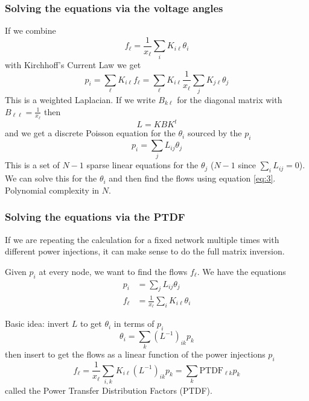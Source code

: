 \documentclass[10pt,aspectratio=169,dvipsnames]{beamer}
\begin{document}
\begin{frame}
  \frametitle{Solving the equations via the voltage angles}

  If we combine
    \begin{equation}
    f_\ell  = \frac{1}{x_\ell}\sum_{i} K_{i\ell} \theta_i \label{eq:3}
  \end{equation}
    with Kirchhoff's Current Law we get
    \begin{equation*}
    p_i = \sum_{\ell} K_{i\ell}f_\ell =   \sum_{\ell} K_{i\ell} \frac{1}{x_\ell}\sum_{j} K_{j\ell} \theta_j
    \end{equation*}
    This is a \alert{weighted Laplacian}. If we write $B_{k\ell}$ for the diagonal matrix with $B_{\ell\ell} = \frac{1}{x_\ell}$ then
    \begin{equation*}
      L = KBK^t
    \end{equation*}
    and we get a \alert{discrete Poisson equation} for the $\theta_i$ sourced by the $p_i$
    \begin{equation*}
      p_i = \sum_{j} L_{ij} \theta_j
    \end{equation*}
    This is a set of $N-1$ sparse linear equations for the $\theta_j$ ($N-1$ since $\sum_i L_{ij} = 0$).
    We can solve this for the $\theta_i$ and then find the flows using equation \eqref{eq:3}. Polynomial complexity in $N$.

\end{frame}


\begin{frame}
  \frametitle{Solving the equations via the PTDF}

  If we are repeating the calculation for a fixed network multiple times with different power injections, it can make sense to do the full matrix inversion.

  Given $p_i$ at every node, we want to find the flows $f_\ell$. We
  have the equations
    \begin{align*}
      p_i & = \sum_{j} L_{ij} \theta_j \\
     f_\ell  & = \frac{1}{x_\ell}\sum_{i} K_{i\ell} \theta_i
    \end{align*}

    Basic idea: invert $L$ to get $\theta_i$ in terms of $p_i$
    \begin{equation*}
      \theta_i  = \sum_{k} (L^{-1})_{ik} p_k
    \end{equation*}
    then insert to get the flows as a linear function of the power injections $p_i$
    \begin{equation*}
    f_\ell   = \frac{1}{x_\ell}\sum_{i,k} K_{i\ell}  (L^{-1})_{ik} p_k = \sum_k \textrm{PTDF}_{\ell k} p_k
    \end{equation*}
    called the \alert{Power Transfer Distribution Factors} (PTDF).

\end{frame}
\end{document}
